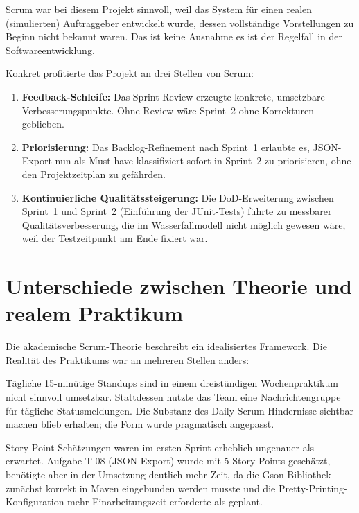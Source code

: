 \documentclass[12pt, a4paper, twoside]{report}
\begin{document}
{Scrum war bei diesem Projekt sinnvoll, weil das System für einen realen (simulierten)
Auftraggeber entwickelt wurde, dessen vollständige Vorstellungen zu Beginn nicht bekannt
waren. Das ist keine Ausnahme \textendash{} es ist der Regelfall in der Softwareentwicklung.

Konkret profitierte das Projekt an drei Stellen von Scrum:

\begin{enumerate}[leftmargin=1.5em]
  \item \textbf{Feedback-Schleife:} Das Sprint Review erzeugte konkrete, umsetzbare
    Verbesserungspunkte. Ohne Review wäre Sprint~2 ohne Korrekturen geblieben.

  \item \textbf{Priorisierung:} Das Backlog-Refinement nach Sprint~1 erlaubte es,
    JSON-Export \textendash{} nun als Must-have klassifiziert \textendash{} sofort in Sprint~2
    zu priorisieren, ohne den Projektzeitplan zu gefährden.

  \item \textbf{Kontinuierliche Qualitätssteigerung:} Die DoD-Erweiterung zwischen
    Sprint~1 und Sprint~2 (Einführung der JUnit-Tests) führte zu messbarer
    Qualitätsverbesserung, die im Wasserfallmodell nicht möglich gewesen wäre, weil
    der Testzeitpunkt am Ende fixiert war.
\end{enumerate}

\section{Unterschiede zwischen Theorie und realem Praktikum}

Die akademische Scrum-Theorie beschreibt ein idealisiertes Framework. Die Realität des
Praktikums war an mehreren Stellen anders:

\begin{description}[leftmargin=2em, style=nextline]
  \item[Daily Scrum vs.\ Realität:] Tägliche 15-minütige Standups sind in einem
    dreistündigen Wochenpraktikum nicht sinnvoll umsetzbar. Stattdessen nutzte das Team
    eine Nachrichtengruppe für tägliche Statusmeldungen. Die Substanz des Daily Scrum
    \textendash{} Hindernisse sichtbar machen \textendash{} blieb erhalten; die Form wurde pragmatisch
    angepasst.

  \item[Velocity vs.\ Realität:] Story-Point-Schätzungen waren im ersten Sprint
    erheblich ungenauer als erwartet. Aufgabe T-08 (JSON-Export) wurde mit 5 Story Points
    geschätzt, benötigte aber in der Umsetzung deutlich mehr Zeit, da die Gson-Bibliothek
    zunächst korrekt in Maven eingebunden werden musste und die Pretty-Printing-Konfiguration
    mehr Einarbeitungszeit erforderte als geplant.


\end{description}}
\end{document}
